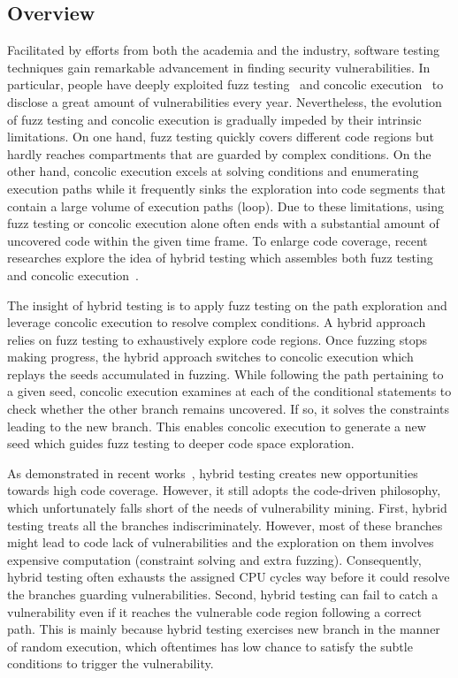 \subsection{Overview}
\label{savior:sec:overview}

Facilitated by efforts from both the academia and the industry, software testing 
techniques gain remarkable advancement in finding security vulnerabilities.
In particular, people have deeply exploited fuzz testing~\cite{takanen2008fuzzing, 
zalewski2014american} and concolic execution~\cite{Sen07a,majumdar2007hybrid}
to disclose a great amount of vulnerabilities every year. Nevertheless, the 
evolution of fuzz testing and concolic execution is gradually impeded by their 
intrinsic limitations. On one hand, fuzz testing quickly covers
different code regions but hardly reaches compartments that are guarded by
complex conditions. On the other hand, concolic execution excels at solving conditions and
enumerating execution paths while it frequently sinks the exploration into code
segments that contain a large volume of execution paths (\eg loop).
Due to these limitations, using fuzz testing or concolic execution alone often
ends with a substantial amount of uncovered code within the given time frame. 
To enlarge code coverage, recent researches explore the idea of hybrid testing which 
assembles both fuzz testing and concolic execution~\cite{qsyminsu,driller,jfuzz}.

The insight of hybrid testing is to apply fuzz testing on the path exploration and 
leverage concolic execution to resolve complex conditions. A hybrid approach relies 
on fuzz testing to exhaustively explore code regions. Once fuzzing stops 
making progress, the hybrid approach switches to concolic execution which replays the 
seeds accumulated in fuzzing. While following the path pertaining to a given seed,
concolic execution examines at each of the conditional statements to check 
whether the other branch remains uncovered. If so, it
solves the constraints leading to the new branch. 
This enables concolic execution to generate a new seed which 
guides fuzz testing to deeper code space exploration.

As demonstrated in recent works~\cite{driller,qsyminsu}, hybrid testing creates new 
opportunities towards high code coverage. However, it still adopts the code-driven philosophy, 
which unfortunately falls short of the needs of vulnerability mining.
First, hybrid testing treats all the branches indiscriminately. However, 
most of these branches might lead to code lack of vulnerabilities and the exploration on 
them involves expensive computation (\eg constraint solving and extra fuzzing). 
Consequently, hybrid testing often exhausts the assigned CPU cycles way before it could 
resolve the branches guarding vulnerabilities. 
%
Second, hybrid testing can fail to catch a vulnerability even if it reaches the vulnerable 
code region following a correct path. This is mainly because hybrid testing exercises new branch in the manner of random execution, which oftentimes has low chance to satisfy the subtle conditions to trigger the vulnerability. 

